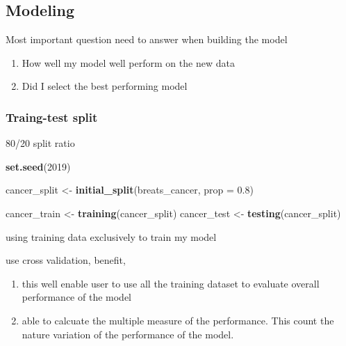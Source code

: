 \documentclass[]{article}
\newenvironment{Shaded}{\begin{snugshade}}{\end{snugshade}}
\newcommand{\DataTypeTok}[1]{\textcolor[rgb]{0.13,0.29,0.53}{#1}}
\newcommand{\DecValTok}[1]{\textcolor[rgb]{0.00,0.00,0.81}{#1}}
\newcommand{\FloatTok}[1]{\textcolor[rgb]{0.00,0.00,0.81}{#1}}
\newcommand{\KeywordTok}[1]{\textcolor[rgb]{0.13,0.29,0.53}{\textbf{#1}}}
\newcommand{\NormalTok}[1]{#1}
\newcommand{\OperatorTok}[1]{\textcolor[rgb]{0.81,0.36,0.00}{\textbf{#1}}}
\newcommand{\StringTok}[1]{\textcolor[rgb]{0.31,0.60,0.02}{#1}}
\providecommand{\tightlist}{%
  \setlength{\itemsep}{0pt}\setlength{\parskip}{0pt}}
\begin{document}
\hypertarget{modeling}{%
\subsection{Modeling}\label{modeling}}

Most important question need to answer when building the model

\begin{enumerate}
\def\labelenumi{\arabic{enumi}.}
\tightlist
\item
  How well my model well perform on the new data
\item
  Did I select the best performing model
\end{enumerate}

\hypertarget{traing-test-split}{%
\subsubsection{Traing-test split}\label{traing-test-split}}

80/20 split ratio

\begin{Shaded}
\begin{Highlighting}[]
\KeywordTok{set.seed}\NormalTok{(}\DecValTok{2019}\NormalTok{)}

\NormalTok{cancer_split <-}\StringTok{ }\KeywordTok{initial_split}\NormalTok{(breats_cancer, }\DataTypeTok{prop =} \FloatTok{0.8}\NormalTok{)}

\NormalTok{cancer_train <-}\StringTok{ }\KeywordTok{training}\NormalTok{(cancer_split)}
\NormalTok{cancer_test <-}\StringTok{ }\KeywordTok{testing}\NormalTok{(cancer_split)}
\end{Highlighting}
\end{Shaded}

using training data exclusively to train my model

use cross validation, benefit,

\begin{enumerate}
\def\labelenumi{\arabic{enumi}.}
\tightlist
\item
  this well enable user to use all the training dataset to evaluate
  overall performance of the model
\item
  able to calcuate the multiple measure of the performance. This count
  the nature variation of the performance of the model.
\end{enumerate}

\begin{Shaded}
\end{Shaded}
\end{document}
